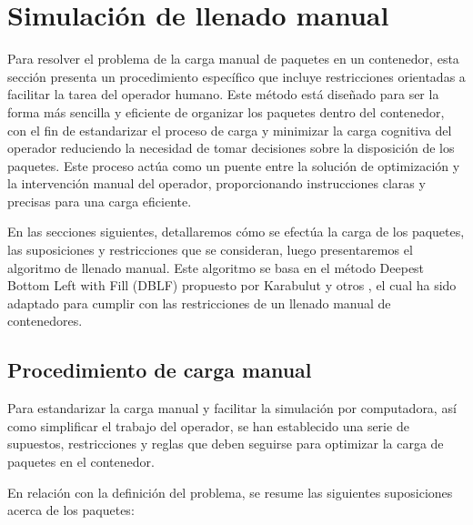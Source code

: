 \section{Simulación de llenado manual}

Para resolver el problema de la carga manual de paquetes en un contenedor, esta sección presenta un procedimiento específico que incluye restricciones orientadas a facilitar la tarea del operador humano. Este método está diseñado para ser la forma más sencilla y eficiente de organizar los paquetes dentro del contenedor, con el fin de estandarizar el proceso de carga y minimizar la carga cognitiva del operador reduciendo la necesidad de tomar decisiones sobre la disposición de los paquetes. Este proceso actúa como un puente entre la solución de optimización y la intervención manual del operador, proporcionando instrucciones claras y precisas para una carga eficiente.

En las secciones siguientes, detallaremos cómo se efectúa la carga de los paquetes, las suposiciones y restricciones que se consideran, luego presentaremos el algoritmo de llenado manual. Este algoritmo se basa en el método Deepest Bottom Left with Fill (DBLF) propuesto por Karabulut y otros \textcite{karabulut2004hybrid}, el cual ha sido adaptado para cumplir con las restricciones de un llenado manual de contenedores.

\subsection{Procedimiento de carga manual}

Para estandarizar la carga manual y facilitar la simulación por computadora, así como simplificar el trabajo del operador, se han establecido una serie de supuestos, restricciones y reglas que deben seguirse para optimizar la carga de paquetes en el contenedor.

En relación con la definición del problema, se resume las siguientes suposiciones acerca de los paquetes:

